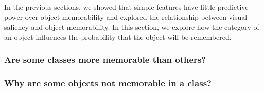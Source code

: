 In the previous sections, we showed that simple features have little predictive power over object memorability and explored the relationship between visual saliency and object memorability. In this section, we explore how the category of an object influences the probability that the object will be remembered.

\subsubsection{Are some classes more memorable than others?}



\subsubsection{Why are some objects not memorable in a class?}



